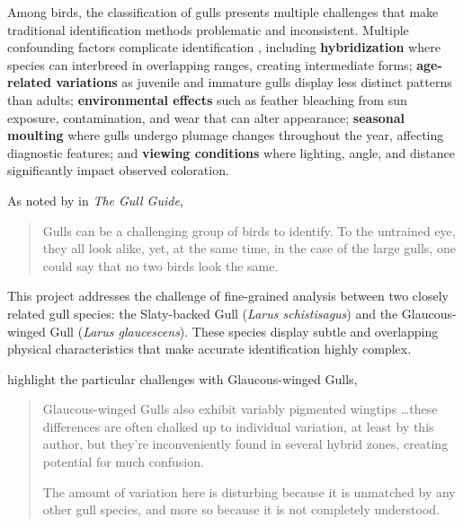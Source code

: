 \documentclass[a4paper,12pt]{report}
\newenvironment{smallquote}
  {\begin{quote}\footnotesize\vspace{0em}}
  {\vspace{0em}\end{quote}}
\begin{document}
Among birds, the classification of gulls presents multiple challenges that make traditional identification methods problematic and inconsistent. Multiple confounding factors complicate identification \citep{adriaens2022}, including \textbf{hybridization} where species can interbreed in overlapping ranges, creating intermediate forms; \textbf{age-related variations} as juvenile and immature gulls display less distinct patterns than adults; \textbf{environmental effects} such as feather bleaching from sun exposure, contamination, and wear that can alter appearance; \textbf{seasonal moulting} where gulls undergo plumage changes throughout the year, affecting diagnostic features; and \textbf{viewing conditions} where lighting, angle, and distance significantly impact observed coloration.

As noted by \citep{ayyash2024} in \textit{The Gull Guide},
\begin{smallquote}
    Gulls can be a challenging group of birds to identify. To the untrained eye, they all look alike, yet, at the same time, in the case of the large gulls, one could say that no two birds look the same.
\end{smallquote}

This project addresses the challenge of fine-grained analysis between two closely related gull species: the Slaty-backed Gull (\textit{Larus schistisagus}) and the Glaucous-winged Gull (\textit{Larus glaucescens}). These species display subtle and overlapping physical characteristics that make accurate identification highly complex.

\citep{adriaens2022gulls} highlight the particular challenges with Glaucous-winged Gulls,
\begin{smallquote}
    Glaucous-winged Gulls also exhibit variably pigmented wingtips \ldots these differences are often chalked up to individual variation, at least by this author, but they're inconveniently found in several hybrid zones, creating potential for much confusion.
    
    The amount of variation here is disturbing because it is unmatched by any other gull species, and more so because it is not completely understood.
\end{smallquote}
\end{document}

